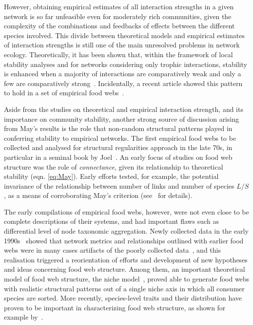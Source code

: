 However, obtaining empirical estimates of all interaction strengths in a given network is so far unfeasible even for moderately rich communities, given the complexity of the combinations and feedbacks of effects between the different species involved. This divide between theoretical models and empirical estimates of interaction strengths is still one of the main unresolved problems in network ecology. Theoretically, it has been shown that, within the framework of local stability analyses and for networks considering only trophic interactions, stability is enhanced when a majority of interactions are comparatively weak and only a few are comparatively strong~\citep{McCann1998,Berlow1999}. Incidentally, a recent article showed this pattern to hold in a set of empirical food webs~\citep{Jacquet2016}.

Aside from the studies on theoretical and empirical interaction strength, and its importance on community stability, another strong source of discussion arising from May's results is the role that non-random structural patterns played in conferring stability to empirical networks. The first empirical food webs to be collected and analysed for structural regularities approach in the late 70s, in particular in a seminal book by Joel~\cite{Cohen1978}. An early focus of studies on food web structure was the role of \textit{connectance}, given its relationship to theoretical stability (eqn. \ref{eq:May}). Early efforts tested, for example, the potential invariance of the relationship between number of links and number of species $L/S$, as a means of corroborating May's criterion (see~\citealt{Pascual2006} for details).

The early compilations of empirical food webs, however, were not even close to be complete descriptions of their systems, and had important flaws such as differential level of node taxonomic aggregation. Newly collected data in the early 1990s~\citep{Polis1991, Martinez1991} showed that network metrics and relationships outlined with earlier food webs were in many cases artifacts of the poorly collected data~\citep{Pascual2006}, and this realisation triggered a reorientation of efforts and development of new hypotheses and ideas concerning food web structure. Among them, an important theoretical model of food web structure, the niche model~\citep{Williams2000}, proved able to generate food webs with realistic structural patterns out of a single niche axis in which all consumer species are sorted. More recently, species-level traits and their distribution have proven to be important in characterizing food web structure, as shown for example by~\cite{Laigle2018}.

